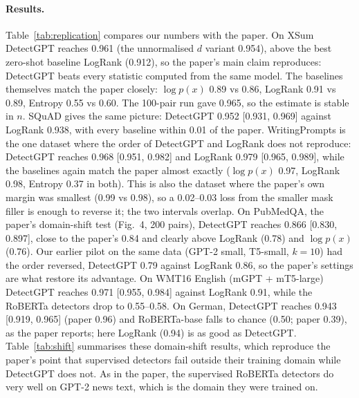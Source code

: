 \documentclass[11pt]{article}
\begin{document}
\paragraph{Results.} Table~\ref{tab:replication} compares our numbers with the paper. On XSum DetectGPT reaches 0.961 (the unnormalised $d$ variant 0.954), above the best zero-shot baseline LogRank (0.912), so the paper's main claim reproduces: DetectGPT beats every statistic computed from the same model. The baselines themselves match the paper closely: $\log p(x)$ 0.89 vs 0.86, LogRank 0.91 vs 0.89, Entropy 0.55 vs 0.60. The 100-pair run gave 0.965, so the estimate is stable in $n$. SQuAD gives the same picture: DetectGPT 0.952 [0.931, 0.969] against LogRank 0.938, with every baseline within 0.01 of the paper. WritingPrompts is the one dataset where the order of DetectGPT and LogRank does not reproduce: DetectGPT reaches 0.968 [0.951, 0.982] and LogRank 0.979 [0.965, 0.989], while the baselines again match the paper almost exactly ($\log p(x)$ 0.97, LogRank 0.98, Entropy 0.37 in both). This is also the dataset where the paper's own margin was smallest (0.99 vs 0.98), so a 0.02--0.03 loss from the smaller mask filler is enough to reverse it; the two intervals overlap. On PubMedQA, the paper's domain-shift test (Fig.~4, 200 pairs), DetectGPT reaches 0.866 [0.830, 0.897], close to the paper's 0.84 and clearly above LogRank (0.78) and $\log p(x)$ (0.76). Our earlier pilot on the same data (GPT-2 small, T5-small, $k=10$) had the order reversed, DetectGPT 0.79 against LogRank 0.86, so the paper's settings are what restore its advantage. On WMT16 English (mGPT + mT5-large) DetectGPT reaches 0.971 [0.955, 0.984] against LogRank 0.91, while the RoBERTa detectors drop to 0.55--0.58. On German, DetectGPT reaches 0.943 [0.919, 0.965] (paper 0.96) and RoBERTa-base falls to chance (0.50; paper 0.39), as the paper reports; here LogRank (0.94) is as good as DetectGPT. Table~\ref{tab:shift} summarises these domain-shift results, which reproduce the paper's point that supervised detectors fail outside their training domain while DetectGPT does not. As in the paper, the supervised RoBERTa detectors do very well on GPT-2 news text, which is the domain they were trained on.
\end{document}
